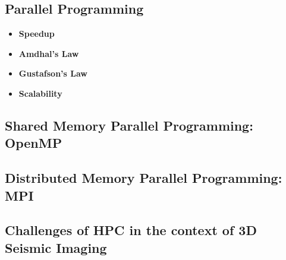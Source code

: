 \subsection{Parallel Programming} \label{scalability}

\begin{itemize}
\item \textbf{Speedup}
\item \textbf{Amdhal's Law}
\item \textbf{Gustafson's Law}
\item \textbf{Scalability}
\end{itemize}

\subsection{Shared Memory Parallel Programming: OpenMP} \label{openMP}
\subsection{Distributed Memory Parallel Programming: MPI}
\subsection{Challenges of HPC in the context of 3D Seismic Imaging}



